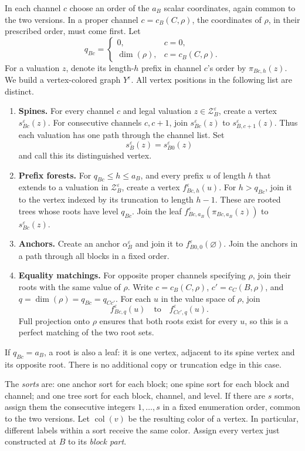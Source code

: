 \documentclass[11pt]{article}
\theoremstyle{definition}
\newcommand{\cZ}{\mathcal Z}
\newcommand{\eps}{\varepsilon}
\begin{document}
In each channel \(c\) choose an order of the \(a_B\) scalar coordinates,
again common to the two versions.  In a proper channel
\(c=c_B(C,\rho)\), the coordinates of \(\rho\), in their prescribed
order, must come first.  Let
\[
 q_{Bc}=
 \begin{cases}
  0,&c=0,\\
  \dim(\rho),&c=c_B(C,\rho).
 \end{cases}
\]
For a valuation \(z\), denote its length-\(h\) prefix in channel \(c\)'s
order by \(\pi_{Bc,h}(z)\).
We build a vertex-colored graph \(Y^\eps\).
All vertex positions in the following list are distinct.

\begin{enumerate}
\item
\textbf{Spines.}
For every channel \(c\) and legal valuation \(z\in\cZ_B^\eps\),
create a vertex \(s_{Bc}^\eps(z)\).
For consecutive channels \(c,c+1\), join
\(s_{Bc}^\eps(z)\) to \(s_{B,c+1}^\eps(z)\).
Thus each valuation has one path through the channel list.
Set
\[
                  s_B^\eps(z)=s_{B0}^\eps(z)
\]
and call this its distinguished vertex.
\item
\textbf{Prefix forests.}
For \(q_{Bc}\le h\le a_B\), and every prefix \(u\) of length \(h\)
that extends to a valuation in \(\cZ_B^\eps\), create a vertex
\(f_{Bc,h}^\eps(u)\).
For \(h>q_{Bc}\), join it to the vertex indexed by its truncation
to length \(h-1\).
These are rooted trees whose roots have level \(q_{Bc}\).
Join the leaf
\(f_{Bc,a_B}^\eps(\pi_{Bc,a_B}(z))\)
to \(s_{Bc}^\eps(z)\).
\item
\textbf{Anchors.}
Create an anchor \(\alpha_B^\eps\) and join it to
\(f_{B0,0}^\eps(\varnothing)\).
Join the anchors in a path through all blocks in a fixed order.
\item
\textbf{Equality matchings.}
For opposite proper channels specifying \(\rho\), join their roots
with the same value of \(\rho\).
Write \(c=c_B(C,\rho)\), \(c'=c_C(B,\rho)\), and
\(q=\dim(\rho)=q_{Bc}=q_{Cc'}\).
For each \(u\) in the value space of \(\rho\), join
\[
 f_{Bc,q}^\eps(u)
 \quad\text{to}\quad
 f_{Cc',q}^\eps(u).
\]
Full projection onto \(\rho\) ensures that both roots exist for every
\(u\), so this is a perfect matching of the two root sets.
\end{enumerate}

If \(q_{Bc}=a_B\), a root is also a leaf: it is one vertex, adjacent
to its spine vertex and its opposite root.
There is no additional copy or truncation edge in this case.

The \emph{sorts} are: one anchor sort for each block; one spine sort
for each block and channel; and one tree sort for each block, channel,
and level.  If there are \(s\) sorts, assign them the consecutive
integers \(1,\ldots,s\) in a fixed enumeration order, common to the
two versions.
Let \(\operatorname{col}(v)\) be the resulting color of a vertex.
In particular, different labels within a sort receive the same color.
Assign every vertex just constructed at \(B\) to its \emph{block part}.
\end{document}

